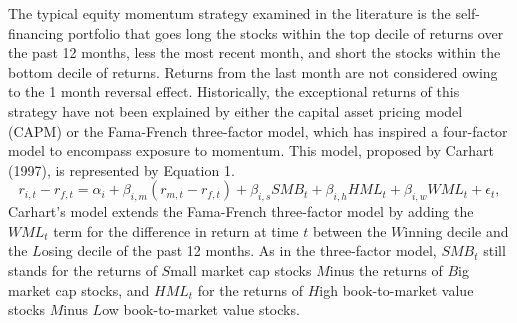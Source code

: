 \documentclass[12pt]{article}
\begin{document}
The typical equity momentum strategy examined in the literature is the self-financing portfolio that goes long the stocks within the top decile of returns over the past 12 months, less the most recent month, and short the stocks within the bottom decile of returns. Returns from the last month are not considered owing to the 1 month reversal effect. Historically, the exceptional returns of this strategy have not been explained by either the capital asset pricing model (CAPM) or the Fama-French three-factor model, which has inspired a four-factor model to encompass exposure to momentum. This model, proposed by Carhart (1997), is represented by Equation 1.
\begin{equation}
r_{i,t}-r_{f,t}=\alpha_{i}+\beta_{i,m}(r_{m,t}-r_{f,t})+\beta_{i,s}SMB_{t}+\beta_{i,h}HML_{t}+\beta_{i,w}WML_{t}+\epsilon_{t},
\end{equation}
Carhart's model extends the Fama-French three-factor model by adding the $WML_{t}$ term for the difference in return at time $t$ between the $W$inning decile and the $L$osing decile of the past 12 months. As in the three-factor model, $SMB_{t}$ still stands for the returns of $S$mall market cap stocks $M$inus the returns of $B$ig market cap stocks, and $HML_{t}$ for the returns of $H$igh book-to-market value stocks $M$inus $L$ow book-to-market value stocks.
\end{document}
